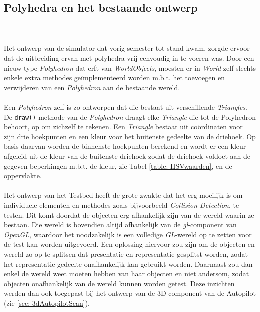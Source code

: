 \subsection{Polyhedra en het bestaande ontwerp}
\\\\
\noindent Het ontwerp van de simulator dat vorig semester tot stand kwam, zorgde ervoor dat de uitbreiding ervan met polyhedra vrij eenvoudig in te voeren was. Door een nieuw type \textit{Polyhedron} dat erft van \textit{WorldObjects}, moesten er in \textit{World} zelf slechts enkele extra methodes ge\"implementeerd worden m.b.t. het toevoegen en verwijderen van een \textit{Polyhedron} aan de bestaande wereld.\\
\\
\noindent 
Een \textit{Polyhedron} zelf is zo ontworpen dat die bestaat uit verschillende \textit{Triangles}. De \texttt{draw()}-methode van de \textit{Polyhedron} draagt elke \textit{Triangle} die tot de Polyhedron behoort, op om zichzelf te tekenen. Een \textit{Triangle} bestaat uit co\"ordinaten voor zijn drie hoekpunten en een kleur voor het buitenste gedeelte van de driehoek. Op basis daarvan worden de binnenste hoekpunten berekend en wordt er een kleur afgeleid uit de kleur van de buitenste driehoek zodat de driehoek voldoet aan de gegeven beperkingen m.b.t. de kleur, zie Tabel \ref{table: HSVwaarden}, en de oppervlakte.\\
\\
\noindent
Het ontwerp van het Testbed heeft de grote zwakte dat het erg moeilijk is om individuele elementen en methodes zoals bijvoorbeeld \textit{Collision Detection}, te testen. Dit komt doordat de objecten erg afhankelijk zijn van de wereld waarin ze bestaan. Die wereld is bovendien altijd afhankelijk van de \textit{gl}-component van \textit{OpenGL}, waardoor het noodzakelijk is een volledige \textit{GL}-wereld op te zetten voor de test kan worden uitgevoerd. Een oplossing hiervoor zou zijn om de objecten en wereld zo op te splitsen dat presentatie en representatie gesplitst worden, zodat het representatie-gedeelte onafhankelijk kan gebruikt worden. Daarnaast zou dan enkel de wereld weet moeten hebben van haar objecten en niet andersom, zodat objecten onafhankelijk van de wereld kunnen worden getest. Deze inzichten werden dan ook toegepast bij het ontwerp van de 3D-component van de Autopilot (zie \ref{sec: 3dAutopilotScan}).\\
\\
\noindent
